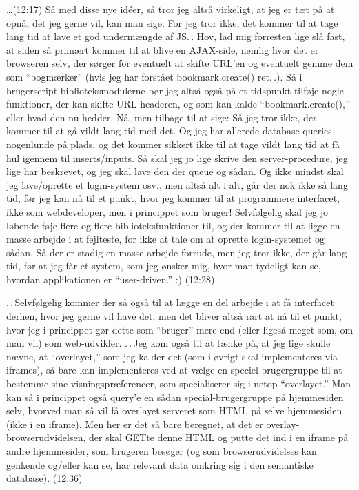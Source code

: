 \documentclass{report}
\begin{document}
\ldots (12:17) Så med disse nye idéer, så tror jeg altså virkeligt, at jeg er tæt på at opnå, det jeg gerne vil, kan man sige. For jeg tror ikke, det kommer til at tage lang tid at lave et god undermængde af JS.\,. Hov, lad mig forresten lige slå fast, at siden så primært kommer til at blive en AJAX-side, nemlig hvor det er browseren selv, der sørger for eventuelt at skifte URL'en og eventuelt gemme dem som ``bogmærker'' (hvis jeg har forstået bookmark.create() ret.\,.). Så i brugerscript-biblioteksmodulerne bør jeg altså også på et tidspunkt tilføje nogle funktioner, der kan skifte URL-headeren, og som kan kalde ``bookmark.create(),'' eller hvad den nu hedder. Nå, men tilbage til at sige: Så jeg tror ikke, der kommer til at gå vildt lang tid med det. Og jeg har allerede database-queries nogenlunde på plads, og det kommer sikkert ikke til at tage vildt lang tid at få hul igennem til inserts/inputs. Så skal jeg jo lige skrive den server-procedure, jeg lige har beskrevet, og jeg skal lave den der queue og sådan. Og ikke mindst skal jeg lave/oprette et login-system osv., men altså alt i alt, går der nok ikke så lang tid, før jeg kan nå til et punkt, hvor jeg kommer til at programmere interfacet, ikke som webdeveloper, men i princippet som bruger! Selvfølgelig skal jeg jo løbende føje flere og flere biblioteksfunktioner til, og der kommer til at ligge en masse arbejde i at fejlteste, for ikke at tale om at oprette login-systemet og sådan. Så der er stadig en masse arbejde forrude, men jeg tror ikke, der går lang tid, før at jeg får et system, som jeg ønsker mig, hvor man tydeligt kan se, hvordan applikationen er ``user-driven.'' :) (12:28)

.\,.\,Selvfølgelig kommer der så også til at lægge en del arbejde i at få interfacet derhen, hvor jeg gerne vil have det, men det bliver altså rart at nå til et punkt, hvor jeg i princippet gør dette som ``bruger'' mere end (eller ligeså meget som, om man vil) som web-udvikler. .\,.\,Jeg kom også til at tænke på, at jeg lige skulle nævne, at ``overlayet,'' som jeg kalder det (som i øvrigt skal implementeres via iframes), så bare kan implementeres ved at vælge en speciel brugergruppe til at bestemme sine visningspræferencer, som specialiserer sig i netop ``overlayet.'' Man kan så i princippet også query'e en sådan special-brugergruppe på hjemmesiden selv, hvorved man så vil få overlayet serveret som HTML på selve hjemmesiden (ikke i en iframe). Men her er det så bare beregnet, at det er overlay-browserudvidelsen, der skal GETte denne HTML og putte det ind i en iframe på andre hjemmesider, som brugeren besøger (og som browserudvidelses kan genkende og/eller kan se, har relevant data omkring sig i den semantiske database). (12:36)
\end{document}
